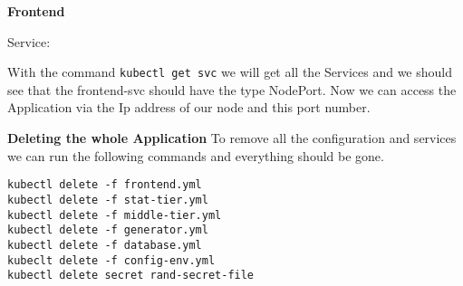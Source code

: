 \textbf{Frontend}


Service:


With the command \texttt{kubectl get svc} we will get all the Services and we should see that the frontend-svc should have the type NodePort.
Now we can access the Application via the Ip address of our node and this port number.

\textbf{Deleting the whole Application}
To remove all the configuration and services we can run the following commands and everything should be gone.
\begin{verbatim}
kubectl delete -f frontend.yml
kubectl delete -f stat-tier.yml
kubectl delete -f middle-tier.yml
kubectl delete -f generator.yml
kubectl delete -f database.yml
kubeclt delete -f config-env.yml
kubectl delete secret rand-secret-file
\end{verbatim}
